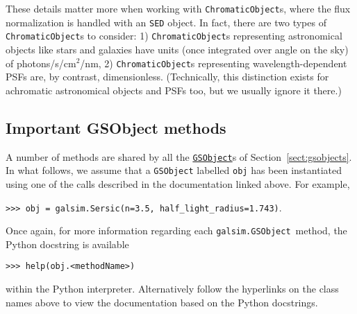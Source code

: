 \documentclass[preprint,10pt]{../../devel/modules/aastex}
\newcommand\GSObject{\href{http://galsim-developers.github.io/GalSim/classgalsim_1_1base_1_1_g_s_object.html}{\texttt{GSObject}}}
\begin{document}
These details matter more when working with \texttt{ChromaticObject}s, where the flux normalization
is handled with an \texttt{SED} object.  In fact, there are two types of \texttt{ChromaticObject}s
to consider: 1) \texttt{ChromaticObject}s representing astronomical objects like stars and galaxies
have units (once integrated over angle on the sky) of photons/s/cm$^2$/nm, 2)
\texttt{ChromaticObject}s representing wavelength-dependent PSFs are, by contrast, dimensionless.
(Technically, this distinction exists for achromatic astronomical objects and PSFs too, but we
usually ignore it there.)


\subsection{Important GSObject methods}\label{sect:gsobjectmethods}
A number of methods are shared by all the \GSObject s of
Section~\ref{sect:gsobjects}.
In what follows, we assume that a
\texttt{GSObject} labelled \texttt{obj} has been instantiated using
one of the calls described in the documentation linked above.  For
example,

\texttt{>>> obj = galsim.Sersic(n=3.5, half\_light\_radius=1.743)}.

Once again, for more information regarding each \texttt{galsim.GSObject}~method,
the Python docstring is available

\texttt{>>> help(obj.<methodName>)}

within the Python interpreter.  Alternatively follow the hyperlinks on
the class names above to view the documentation based
on the Python docstrings.
\end{document}

